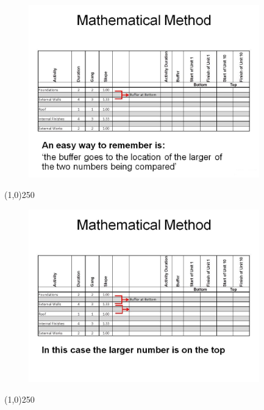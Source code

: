 \begin{frame}
\begin{figure}
	\centering
		\includegraphics[width = 10.0cm]{oldnotes/Slide274.jpg}
\end{figure}
\end{frame}
\begin{center}\line(1,0){250}\end{center}






\begin{frame}
\begin{figure}
	\centering
		\includegraphics[width = 10.0cm]{oldnotes/Slide275.jpg}
\end{figure}
\end{frame}
\begin{center}\line(1,0){250}\end{center}






